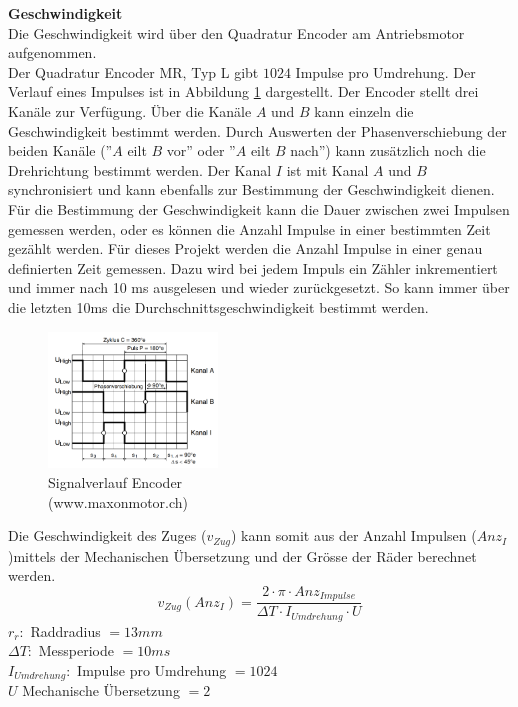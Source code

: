 \documentclass[../../main.tex]{subfiles}
\begin{document}
    \textbf{Geschwindigkeit}\\
    Die Geschwindigkeit wird über den Quadratur Encoder am Antriebsmotor aufgenommen.\\
    Der Quadratur Encoder MR, Typ L gibt $1024$ Impulse pro Umdrehung. Der Verlauf eines Impulses ist in Abbildung \ref{fig:et_encoder} dargestellt. Der Encoder stellt drei Kanäle zur Verfügung. Über die Kanäle $A$ und $B$ kann einzeln die Geschwindigkeit bestimmt werden. Durch Auswerten der Phasenverschiebung der beiden Kanäle (''$A$ eilt $B$ vor'' oder ''$A$ eilt $B$ nach'') kann zusätzlich noch die Drehrichtung bestimmt werden. Der Kanal $I$ ist mit Kanal $A$ und $B$ synchronisiert und kann ebenfalls zur Bestimmung der Geschwindigkeit dienen.\\
    Für die Bestimmung der Geschwindigkeit kann die Dauer zwischen zwei Impulsen gemessen werden, oder es können die Anzahl Impulse in einer bestimmten Zeit gezählt werden. Für dieses Projekt werden die Anzahl Impulse in einer genau definierten Zeit gemessen. Dazu wird bei jedem Impuls ein Zähler inkrementiert und immer nach 10 ms ausgelesen und wieder zurückgesetzt. So kann immer über die letzten 10ms die Durchschnittsgeschwindigkeit bestimmt werden.\\

    \begin{figure}
        \centering
        \includegraphics[width=0.4\textwidth]{../../images/et/Encoder_MR.png}
        \caption {Signalverlauf Encoder\\ (www.maxonmotor.ch)}
        \label{fig:et_encoder}
    \end{figure}

    Die Geschwindigkeit des Zuges ($v_{Zug}$) kann somit aus der Anzahl Impulsen ($Anz_{I}$)mittels der Mechanischen Übersetzung und der Grösse der Räder berechnet werden.
    \begin{equation} \label{eq:et_v_zug}
        v_{Zug}(Anz_{I}) = \frac{2 \cdot \pi \cdot Anz_{Impulse}}{\Delta T \cdot I_{Umdrehung} \cdot U}
    \end{equation}
    $r_r:$ Raddradius  $=13mm$\\
    $\Delta T:$  Messperiode  $=10ms$\\
    $I_{Umdrehung}:$  Impulse pro Umdrehung  $=1024$\\
    $U$  Mechanische Übersetzung  $=2$\\
\end{document}
